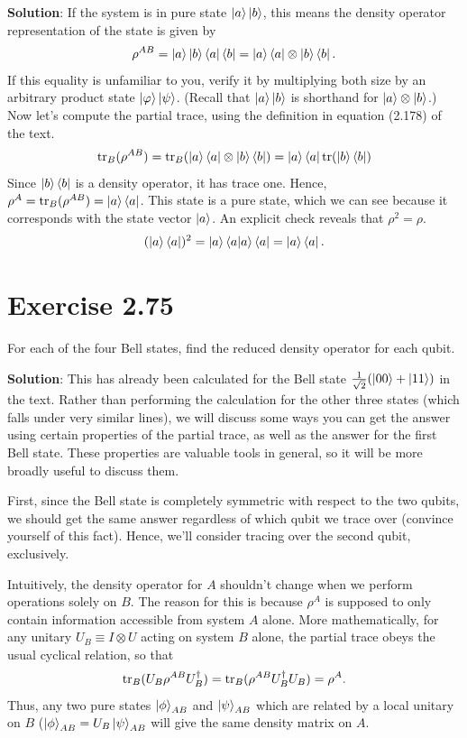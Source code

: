 \documentclass{book}
\begin{document}
    \textbf{Solution}: If the system is in pure state $\ket{a}\ket{b}$, this means the density operator representation of the state is given by
    \begin{align}
        \rho^{AB} = \ket{a}\ket{b}\bra{a}\bra{b} = \ket{a}\bra{a}\otimes \ket{b}\bra{b}.
    \end{align}
    If this equality is unfamiliar to you, verify it by multiplying both size by an arbitrary product state $\ket{\varphi} \ket{\psi}$. (Recall that $\ket{a}\ket{b}$ is shorthand for $\ket{a}\otimes \ket{b}$.) Now let's compute the partial trace, using the definition in equation (2.178) of the text.
    \begin{align}
        \tr_B(\rho^{AB}) = \tr_B(\ket{a}\bra{a}\otimes \ket{b}\bra{b}) = \ket{a}\bra{a} \tr(\ket{b}\bra{b})
    \end{align}
    Since $\ket{b}\bra{b}$ is a density operator, it has trace one. Hence, $\rho^A = \tr_B(\rho^{AB}) = \ket{a}\bra{a}$. This state is a pure state, which we can see because it corresponds with the state vector $\ket{a}$. An explicit check reveals that $\rho^2 = \rho$.
    \begin{align}
        (\ket{a}\bra{a})^2 = \ket{a}\bra{a}\ket{a}\bra{a} = \ket{a}\bra{a}.
    \end{align}

\section*{Exercise 2.75}
    For each of the four Bell states, find the reduced density operator for each qubit.

    \textbf{Solution}: This has already been calculated for the Bell state $\frac{1}{\sqrt{2}}(\ket{00}+\ket{11})$ in the text. Rather than performing the calculation for the other three states (which falls under very similar lines), we will discuss some ways you can get the answer using certain properties of the partial trace, as well as the answer for the first Bell state. These properties are valuable tools in general, so it will be more broadly useful to discuss them.

    First, since the Bell state is completely symmetric with respect to the two qubits, we should get the same answer regardless of which qubit we trace over (convince yourself of this fact). Hence, we'll consider tracing over the second qubit, exclusively. 

    Intuitively, the density operator for $A$ shouldn't change when we perform operations solely on $B$. The reason for this is because $\rho^A$ is supposed to only contain information accessible from system $A$ alone. More mathematically, for any unitary $U_B \equiv I \otimes U$ acting on system $B$ alone, the partial trace obeys the usual cyclical relation, so that
    \begin{align}
        \tr_B(U_B \rho^{AB} U_B^\dagger) = \tr_B(\rho^{AB} U_B^\dagger U_B) = \rho^A.
    \end{align}
    Thus, any two pure states $\ket{\phi}_{AB}$ and $\ket{\psi}_{AB}$ which are related by a local unitary on $B$ ($\ket{\phi}_{AB} = U_B \ket{\psi}_{AB}$ will give the same density matrix on $A$.
\end{document}

